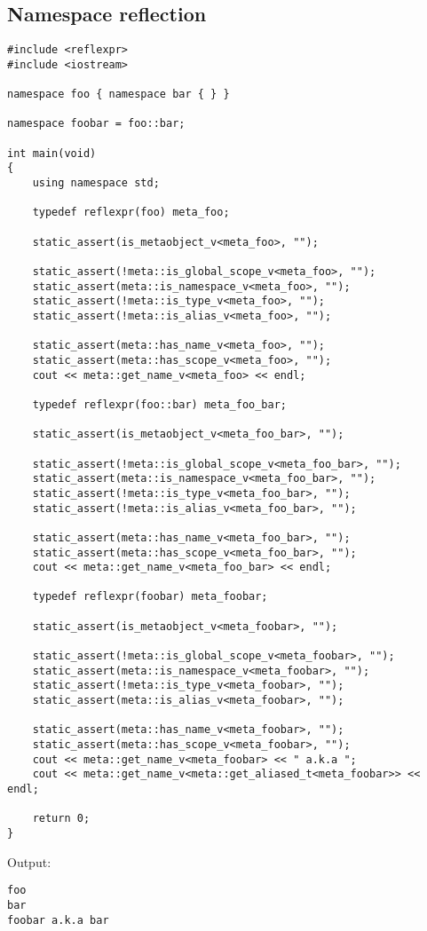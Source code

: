 \subsection{Namespace reflection}

\begin{verbatim}
#include <reflexpr>
#include <iostream>

namespace foo { namespace bar { } }

namespace foobar = foo::bar;

int main(void)
{
	using namespace std;

	typedef reflexpr(foo) meta_foo;

	static_assert(is_metaobject_v<meta_foo>, "");

	static_assert(!meta::is_global_scope_v<meta_foo>, "");
	static_assert(meta::is_namespace_v<meta_foo>, "");
	static_assert(!meta::is_type_v<meta_foo>, "");
	static_assert(!meta::is_alias_v<meta_foo>, "");

	static_assert(meta::has_name_v<meta_foo>, "");
	static_assert(meta::has_scope_v<meta_foo>, "");
	cout << meta::get_name_v<meta_foo> << endl;

	typedef reflexpr(foo::bar) meta_foo_bar;

	static_assert(is_metaobject_v<meta_foo_bar>, "");

	static_assert(!meta::is_global_scope_v<meta_foo_bar>, "");
	static_assert(meta::is_namespace_v<meta_foo_bar>, "");
	static_assert(!meta::is_type_v<meta_foo_bar>, "");
	static_assert(!meta::is_alias_v<meta_foo_bar>, "");

	static_assert(meta::has_name_v<meta_foo_bar>, "");
	static_assert(meta::has_scope_v<meta_foo_bar>, "");
	cout << meta::get_name_v<meta_foo_bar> << endl;

	typedef reflexpr(foobar) meta_foobar;

	static_assert(is_metaobject_v<meta_foobar>, "");

	static_assert(!meta::is_global_scope_v<meta_foobar>, "");
	static_assert(meta::is_namespace_v<meta_foobar>, "");
	static_assert(!meta::is_type_v<meta_foobar>, "");
	static_assert(meta::is_alias_v<meta_foobar>, "");

	static_assert(meta::has_name_v<meta_foobar>, "");
	static_assert(meta::has_scope_v<meta_foobar>, "");
	cout << meta::get_name_v<meta_foobar> << " a.k.a ";
	cout << meta::get_name_v<meta::get_aliased_t<meta_foobar>> << endl;

	return 0;
}
\end{verbatim}

Output:

\begin{verbatim}
foo
bar
foobar a.k.a bar
\end{verbatim}

